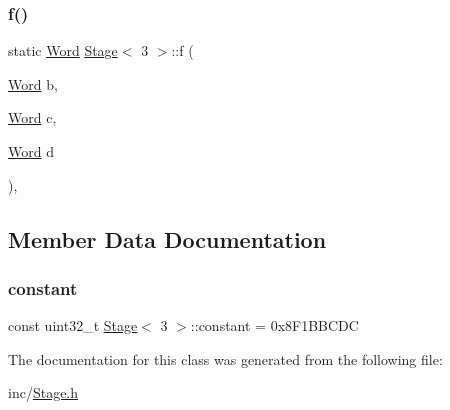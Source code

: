 \subsubsection{\texorpdfstring{f()}{f()}}
{\footnotesize\ttfamily static \mbox{\hyperlink{class_word}{Word}} \mbox{\hyperlink{class_stage}{Stage}}$<$ 3 $>$\+::f (\begin{DoxyParamCaption}\item[{\mbox{\hyperlink{class_word}{Word}}}]{b,  }\item[{\mbox{\hyperlink{class_word}{Word}}}]{c,  }\item[{\mbox{\hyperlink{class_word}{Word}}}]{d }\end{DoxyParamCaption})\hspace{0.3cm}{\ttfamily [inline]}, {\ttfamily [static]}}



\subsection{Member Data Documentation}
\mbox{\label{class_stage_3_013_01_4_acce4d5c568e6fc7fa7083186da79d378}} 
\subsubsection{\texorpdfstring{constant}{constant}}
{\footnotesize\ttfamily const uint32\+\_\+t \mbox{\hyperlink{class_stage}{Stage}}$<$ 3 $>$\+::constant = 0x8\+F1\+B\+B\+C\+DC\hspace{0.3cm}{\ttfamily [static]}}



The documentation for this class was generated from the following file\+:\begin{DoxyCompactItemize}
\item 
inc/\mbox{\hyperlink{_stage_8h}{Stage.\+h}}\end{DoxyCompactItemize}
